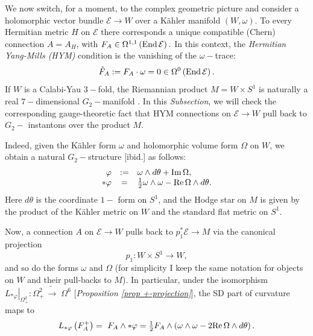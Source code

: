 \documentclass{article}
\newcommand{\func}[1]{\textnormal {#1\,}}
\newcommand{\mc}[1]{\mathcal{#1}}
\begin{document}
We now switch, for a moment, to the complex geometric picture and consider a holomorphic vector bundle $\mathcal{E}\rightarrow W$ over a K\"ahler manifold $\left( W,\omega \right)$. To every Hermitian metric $H$ on $\mathcal{E}$ there corresponds a unique  compatible (Chern) connection $A=A_H$, with 
$F_{A}\in\Omega^{1,1}\left( \func{End}\mc{E} \right).$ In this context, the \emph{Hermitian Yang-Mills (HYM)} condition is the vanishing of the  $\omega-$trace: 
\begin{equation}
\hat F_A:=F_A\cdot\omega=0\in\Omega^{0}\left( \func{End}\mc{E} \right).
\end{equation}
If $W$ is a Calabi-Yau $3-$fold, the Riemannian product $M=W\times S^{1}$ is
naturally a real $7-$dimensional $G_{2}-$manifold \cite[p.564]{Bryant}\cite[11.1.2]{Joyce}. In this \emph{Subsection}, we will check the corresponding gauge-theoretic fact that HYM 
connections on $\mathcal{E}\rightarrow W$ pull back to $G_{2}-$%
instantons over the product $M$.

Indeed, given the K\"{a}hler form $\omega  $ and holomorphic volume form $\Omega $ on $W$, we obtain a natural $G_2-$structure [ibid.] as follows:%
\begin{equation}        \label{kahler -> G2}
\begin{array}{r c l}
        \varphi &:=&\omega \wedge d\theta +\func{Im}\Omega,\\
        \ast \varphi &=&\tfrac{1}{2}\omega\wedge\omega 
        -\func{Re}\Omega \wedge d\theta .
\end{array}
\end{equation}
Here $d\theta $ is the coordinate $1-$ form on $S^{1}$, and the Hodge
star on $M$ is given by the product of the K\"{a}hler metric on $W$ and the
standard flat metric on $S^{1}$. 

Now, a connection $A$ on $\mathcal{E}\rightarrow W$  pulls back to  $p_1^*\mathcal{E}\rightarrow M$
via the canonical projection 
$$
p_1:W\times S^{1}\to W,
$$and so do the forms $\omega $ and $\Omega $ (for simplicity I keep the same
notation for objects on $W$ and their pull-backs to $M$). In particular, under the isomorphism $\left. L_{\ast \varphi} \right\vert _{\Omega
_{+}^{2}}:\Omega_{+}^{2} \, \tilde{\rightarrow} \; \Omega^{6}$ [\emph{Proposition \ref{prop +-projection}}], the
SD part of curvature maps to 
\begin{equation}        \label{sd part kahler -> G2}
        L_{\ast\varphi}\left(F_{A}^{+}\right)
        =\ F_A\wedge\ast\varphi
        =\tfrac{1}{2}F_{A}\wedge \left( \omega \wedge \omega -2\func{Re}%
        \Omega \wedge d\theta \right) . 
\end{equation}
\end{document}
